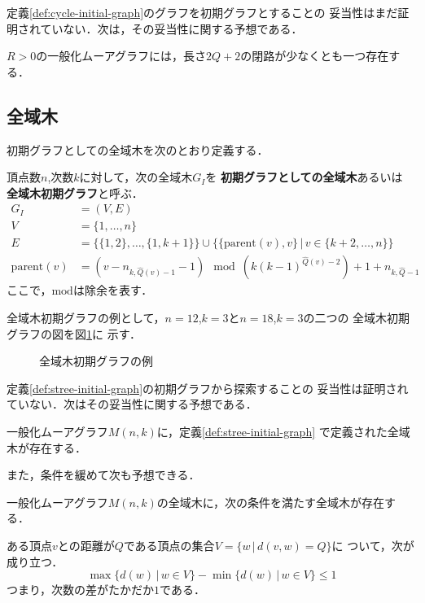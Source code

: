 定義\ref{def:cycle-initial-graph}のグラフを初期グラフとすることの
妥当性はまだ証明されていない．次は，その妥当性に関する予想である．

\begin{conjecture}\rm
  \label{conj:gmg-cycle}
  $R>0$の一般化ムーアグラフには，長さ$2Q+2$の閉路が少なくとも一つ存在する．
\end{conjecture}

\subsection{全域木}
\label{subsect:initial-spanning-tree}
初期グラフとしての全域木を次のとおり定義する．
\begin{definition}[初期グラフとしての全域木]\rm
  \label{def:stree-initial-graph}
  頂点数$n$,次数$k$に対して，次の全域木$G_I$を
  \textbf{初期グラフとしての全域木}あるいは
  \textbf{全域木初期グラフ}と呼ぶ．
  \begin{equation}
    \begin{aligned}
      G_I&=(V,E) \\
      V&=\{1,\ldots,n\} \\
      E&=\{\{1,2\},\ldots,\{1,k+1\}\}\cup
      \{\{\text{parent}(v),v\}\,|\,v\in \{k+2,\ldots,n\}\}  \\
      \text{parent}(v)&=
      (v-n_{k,\hat{Q}(v)-1}-1)\mod(k(k-1)^{\hat{Q}(v)-2})+1+n_{k,\hat{Q}-1}
    \end{aligned}
  \end{equation}
  ここで，$\text{mod}$は除余を表す．
\end{definition}
全域木初期グラフの例として，$n=12$,$k=3$と$n=18$,$k=3$の二つの
全域木初期グラフの図を図\ref{fig:initial-spanning-tree-example}に
示す．

\begin{figure}
  \centering
  \hfill
  \caption{全域木初期グラフの例}
  \label{fig:initial-spanning-tree-example}
\end{figure}

定義\ref{def:stree-initial-graph}の初期グラフから探索することの
妥当性は証明されていない．次はその妥当性に関する予想である．
\begin{conjecture}\rm
  \label{conj:spanning-tree}
  一般化ムーアグラフ$M(n,k)$に，定義\ref{def:stree-initial-graph}
  で定義された全域木が存在する．
\end{conjecture}
また，条件を緩めて次も予想できる．
\begin{conjecture}\rm
  \label{conj:spanning-tree-2}
  一般化ムーアグラフ$M(n,k)$の全域木に，次の条件を満たす全域木が存在する．\par
  ある頂点$v$との距離が$Q$である頂点の集合$V=\{w\,|\,d(v,w)=Q\}$に
  ついて，次が成り立つ．
  \[ \max\{d(w)\,|\,w\in V\}-\min\{d(w)\,|\,w\in V\}\leq 1 \]
  つまり，次数の差がたかだか$1$である．
\end{conjecture}

